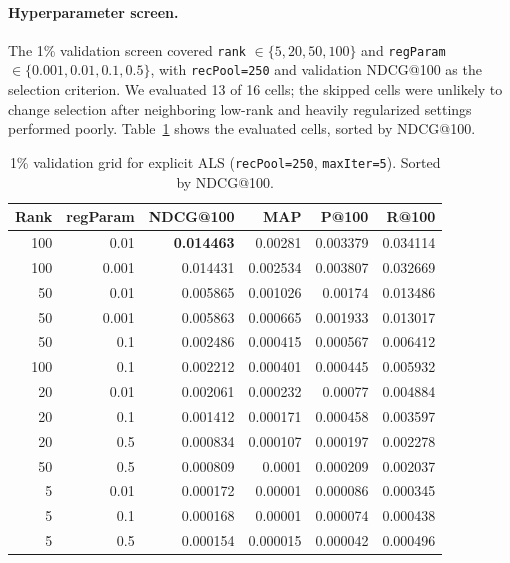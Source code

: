 \documentclass[10pt,twocolumn]{article}
\begin{document}
\paragraph{Hyperparameter screen.} The 1\% validation screen covered \texttt{rank} $\in \{5, 20, 50, 100\}$ and \texttt{regParam} $\in \{0.001, 0.01, 0.1, 0.5\}$, with \texttt{recPool=250} and validation NDCG@100 as the selection criterion. We evaluated 13 of 16 cells; the skipped cells were unlikely to change selection after neighboring low-rank and heavily regularized settings performed poorly. Table~\ref{tab:sweep} shows the evaluated cells, sorted by NDCG@100.

\begin{table}[!ht]
\centering
\caption{1\% validation grid for explicit ALS (\texttt{recPool=250}, \texttt{maxIter=5}). Sorted by NDCG@100.}
\label{tab:sweep}
\footnotesize
\setlength{\tabcolsep}{3pt}
\begin{tabular}{r r r r r r}
\toprule
\textbf{Rank} & \textbf{regParam} & \textbf{NDCG@100} & \textbf{MAP} & \textbf{P@100} & \textbf{R@100} \\
\midrule
100 & 0.01  & \textbf{0.014463} & 0.00281 & 0.003379 & 0.034114 \\
100 & 0.001 & 0.014431          & 0.002534 & 0.003807 & 0.032669 \\
50  & 0.01  & 0.005865          & 0.001026 & 0.00174 & 0.013486 \\
50  & 0.001 & 0.005863          & 0.000665 & 0.001933 & 0.013017 \\
50  & 0.1   & 0.002486          & 0.000415 & 0.000567 & 0.006412 \\
100 & 0.1   & 0.002212          & 0.000401 & 0.000445 & 0.005932 \\
20  & 0.01  & 0.002061          & 0.000232 & 0.00077 & 0.004884 \\
20  & 0.1   & 0.001412          & 0.000171 & 0.000458 & 0.003597 \\
20  & 0.5   & 0.000834          & 0.000107 & 0.000197 & 0.002278 \\
50  & 0.5   & 0.000809          & 0.0001 & 0.000209 & 0.002037 \\
5   & 0.01  & 0.000172          & 0.00001 & 0.000086 & 0.000345 \\
5   & 0.1   & 0.000168          & 0.00001 & 0.000074 & 0.000438 \\
5   & 0.5   & 0.000154          & 0.000015 & 0.000042 & 0.000496 \\
\bottomrule
\end{tabular}
\end{table}
\end{document}
